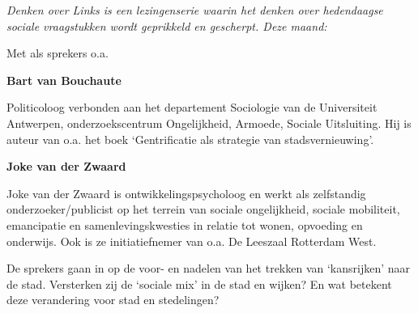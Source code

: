 \documentclass[12pt]{article}
\begin{document}

\emph{Denken over Links is een lezingenserie waarin het denken over hedendaagse
sociale vraagstukken wordt geprikkeld en gescherpt. Deze maand:}

\vfill


Met als sprekers o.a.

\textbf{Bart van Bouchaute}

\hfill\parbox{.95\columnwidth}{
Politicoloog verbonden aan het departement Sociologie van de Universiteit
Antwerpen, onderzoekscentrum Ongelijkheid, Armoede, Sociale Uitsluiting. Hij
is auteur van o.a. het boek `Gentrificatie als strategie van stadsvernieuwing'.}

\textbf{Joke van der Zwaard}

\hfill\parbox{.95\columnwidth}{
Joke van der Zwaard is ontwikkelingspsycholoog en werkt als zelfstandig
onderzoeker/publicist op het terrein van sociale ongelijkheid, sociale
mobiliteit, emancipatie en samenlevingskwesties in relatie tot wonen, opvoeding
en onderwijs. Ook is ze initiatiefnemer van o.a. De Leeszaal Rotterdam West.}

De sprekers gaan in op de voor- en nadelen van het trekken van `kansrijken'
naar de stad. Versterken zij de `sociale mix' in de stad en wijken?  En wat
betekent deze verandering voor stad en stedelingen?

\DolFooterLarge
\end{document}
